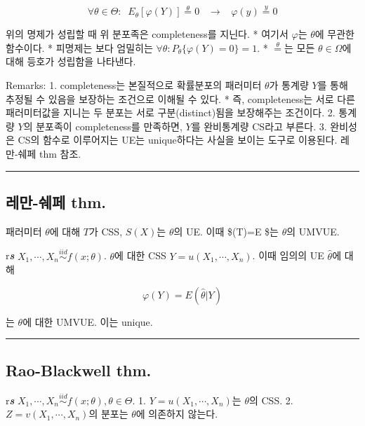 \documentclass[
]{book}
\begin{document}
\[
\forall \theta \in \Theta: \; \; E_{\theta} \left[ \varphi(Y) \right] \overset{\theta}{=}{0} \; \; \; \rightarrow \; \; \; \varphi(y) \overset{y}{=} 0
\]

위의 명제가 성립할 때 위 분포족은 completeness를 지닌다.
* 여기서 \(\varphi\)는 \(\theta\)에 무관한 함수이다.
* 피명제는 보다 엄밀히는 \(\forall \theta: P_{\theta} \{ \varphi (Y)=0 \}=1\).
* \(\overset{\theta}{=}\)는 모든 \(\theta \in \Omega\)에 대해 등호가 성립함을 나타낸다.

Remarks:
1. completeness는 본질적으로 확률분포의 패러미터 \(\theta\)가 통계량 \(Y\)를 통해 추정될 수 있음을 보장하는 조건으로 이해될 수 있다.
* 즉, completeness는 서로 다른 패러미터값을 지니는 두 분포는 서로 구분(distinct)됨을 보장해주는 조건이다.
2. 통계량 \(Y\)의 분포족이 completeness를 만족하면, \(Y\)를 완비통계량 CS라고 부른다.
3. 완비성은 CS의 함수로 이루어지는 UE는 unique하다는 사실을 보이는 도구로 이용된다. 레만-쉐페 thm 참조.

\begin{center}\rule{0.5\linewidth}{0.5pt}\end{center}

\hypertarget{uxb808uxb9cc-uxc250uxd398-thm.}{%
\subsection{레만-쉐페 thm.}\label{uxb808uxb9cc-uxc250uxd398-thm.}}

패러미터 \(\theta\)에 대해 \(T\)가 CSS, \(S(X)\)는 \(\theta\)의 UE. 이때 \$\delta(T)=E  \$는 \(\theta\)의 UMVUE.

r\textbf{\emph{s}} \(X_1 , \cdots, X_n \overset{iid}{\sim} f(x;\theta)\). \(\theta\)에 대한 CSS \(Y=u(X_1 , \cdots, X_n)\). 이때 임의의 UE \(\hat \theta\)에 대해

\[
\varphi (Y) = E(\hat \theta \rvert Y)
\]

는 \(\theta\)에 대한 UMVUE. 이는 unique.

\begin{center}\rule{0.5\linewidth}{0.5pt}\end{center}

\hypertarget{rao-blackwell-thm.-1}{%
\subsection{Rao-Blackwell thm.}\label{rao-blackwell-thm.-1}}

r\textbf{\emph{s}} \(X_1 , \cdots, X_n \overset{iid}{\sim} f(x;\theta), \theta \in \Theta\).
1. \(Y= u(X_1 , \cdots, X_n)\)는 \(\theta\)의 CSS.
2. \(Z= v(X_1 , \cdots, X_n)\)의 분포는 \(\theta\)에 의존하지 않는다.
\end{document}
